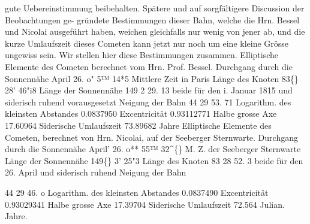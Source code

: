 \documentclass[12pt,a4paper]{article}
\newcommand{\degree}{\textdegree}
\begin{document}
gute  Uebereinstimmung  beibehalten.  Spätere  und  auf  sorgfältigere  Discussion  der  Beobachtungen  ge- 
gründete Bestimmungen  dieser  Bahn,  welche  die  Hrn.  Bessel  und  Nicolai  ausgeführt  haben,  weichen 
gleichfalls  nur  wenig  von  jener  ab,  und  die  kurze  Umlaufszeit  dieses  Cometen  kann  jetzt  nur  noch  um 
eine  kleine  Grösse  ungewiss  sein.     Wir  stellen  hier  diese  Bestimmungen  zusammen. 
Elliptische  Elemente  des   Cometen  berechnet  vom  Hrn.   Prof.  Bessel. 
Durchgang  durch  die  Sonnennähe  April  26.  o"  5™  14*5  Mittlere  Zeit  in  Paris 
Länge  des  Knoten   
83\degree\{\}  28'    46"i8 
Länge  der  Sonnennähe   
149      2     29. 13 
beide  für  den  i.  Januar  1815  und  siderisch  ruhend  vorausgesetzt 
Neigung  der  Bahn   
44     29     53. 71 
Logarithm.  des  kleinsten  Abstandes   
0.0837950 
Excentricität   
0.93112771 
Halbe  grosse  Axe   
17.60964 
Siderische  Umlaufszeit   
73.89682  Jahre 
Elliptische  Elemente  des   Cometen,  berechnet  von  Hrn.  Nicolai,  auf  der  Seeberger  Sternwarte. 
Durchgang  durch  die  Sonnennähe  April' 26.  o**  55™  32\textasciicircum\{\}   M.  Z.   der  Seeberger  Sternwarte 
Länge  der  Sonnennähe   
149\degree\{\}     3'    25"3 
Länge  des  Knoten   
83     28     52. 3 
beide  für  den  26.  April  und  siderisch  ruhend 
Neigung  der  Bahn       

44     29     46.  o 
Logarithm.  des  kleinsten  Abstandes   
0.0837490 
Excentricität   
0.93029341 
Halbe  grosse  Axe   
17.39704 
Siderische  Umlaufszeit   
72.564  Julian.  Jahre. 
\end{document}
